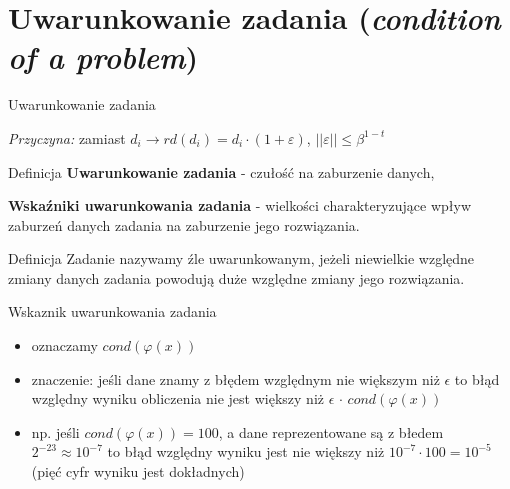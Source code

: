 \section{Uwarunkowanie zadania ({\it condition of a problem})}
\begin{frame}{Uwarunkowanie zadania}

	{\it Przyczyna:} zamiast 
    	$d_i \rightarrow rd(d_i) = d_i \cdot (1 + \varepsilon)$,
        $||\varepsilon|| \le \beta^{1-t}$
        
    \begin{block}{Definicja}
    	{\bf Uwarunkowanie zadania} - czułość na zaburzenie danych,
        
        {\bf Wskaźniki uwarunkowania zadania} - wielkości charakteryzujące wpływ zaburzeń danych zadania na zaburzenie jego rozwiązania.
    \end{block}
    
    \begin{block}{Definicja}
    Zadanie nazywamy źle uwarunkowanym, jeżeli niewielkie względne zmiany danych zadania powodują duże względne zmiany jego rozwiązania.
    \end{block}
\end{frame}

\begin{frame}{Wskaznik uwarunkowania zadania}
\begin{itemize}
    \item oznaczamy $cond(\varphi(x))$
    \item znaczenie: jeśli dane znamy z błędem względnym nie większym niż $\epsilon$ to błąd względny wyniku  obliczenia nie jest większy niż $\epsilon$ $\cdot$  $cond(\varphi(x))$
    \item np. jeśli $cond(\varphi(x))=100$, a dane reprezentowane są z błedem $2^{-23} \approx 10^{-7}$ to błąd względny wyniku jest nie większy niż $10^{-7} \cdot 100 = 10^{-5}$ (pięć cyfr wyniku jest dokładnych)
\end{itemize}
\end{frame}

